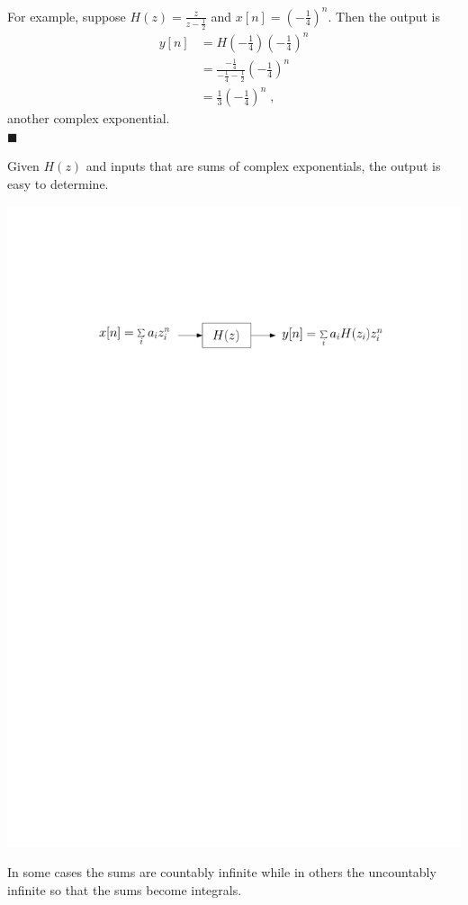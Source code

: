\begin{example}
  For example, suppose $H(z) = \frac{z}{z-\frac{1}{2}}$ and $x[n] = \left(-\frac{1}{4}\right)^n$. Then the output is
  \begin{align*}
    y[n] &= H\left(-\frac{1}{4}\right)\left(-\frac{1}{4}\right)^n\\
    &= \frac{-\frac{1}{4}}{-\frac{1}{4}-\frac{1}{2}}\left(-\frac{1}{4}\right)^n\\
    &= \frac{1}{3}\left(-\frac{1}{4}\right)^n \; ,
  \end{align*}
another complex exponential.\\
$\blacksquare$
\end{example}

Given $H(z)$ and inputs that are sums of complex exponentials, the output is easy to determine.

\begin{center}
  \includegraphics[scale=0.6]{graphics/dt-linear-response-complex-exp.pdf}
\end{center}
In some cases the sums are countably infinite while in others the uncountably infinite so that the sums become integrals.

